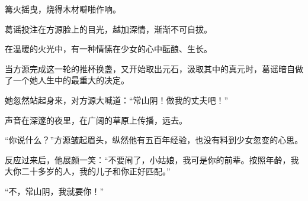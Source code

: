 \begin{this_body}
篝火摇曳，烧得木材噼啪作响。

葛谣投注在方源脸上的目光，越加深情，渐渐不可自拔。

在温暖的火光中，有一种情愫在少女的心中酝酿、生长。

当方源完成这一轮的推杯换盏，又开始取出元石，汲取其中的真元时，葛谣暗自做了一个她人生中的最重大的决定。

她忽然站起身来，对方源大喊道：“常山阴！做我的丈夫吧！”

声音在深邃的夜里，在广阔的草原上传播，远去。

“你说什么？”方源皱起眉头，纵然他有五百年经验，也没有料到少女忽变的心思。

反应过来后，他展颜一笑：“不要闹了，小姑娘，我可是你的前辈。按照年龄，我大你二十多岁的人，我的儿子和你正好匹配。”

“不，常山阴，我就要你！”

\end{this_body}

